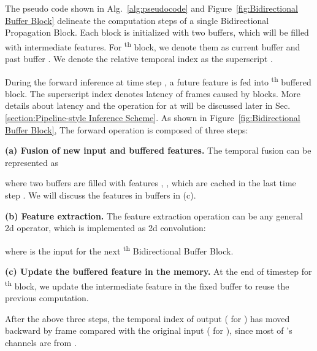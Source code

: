 \documentclass[sigconf]{acmart}
\newcommand{\ts}{\textsuperscript}
\begin{document}
The pseudo code shown in Alg.~\ref{alg:pseudocode} and Figure~\ref{fig:Bidirectional Buffer Block} delineate the computation steps of a single Bidirectional Propagation Block. 
Each block is initialized with two buffers, which will be filled with intermediate features. For \ts{th} block, we denote them as current buffer  and past buffer . We denote the relative temporal index as the superscript .


During the forward inference at time step , a future feature  is fed into \ts{th} buffered block. The superscript index  denotes latency of  frames caused by  blocks. More details about latency and the operation for  at will be discussed later in Sec.\ref{section:Pipeline-style Inference Scheme}.
As shown in Figure~\ref{fig:Bidirectional Buffer Block}, The forward operation is composed of three steps:


\textbf{(a) Fusion of new input and buffered features.}
The temporal fusion can be represented as 

where two buffers are filled with features , , which are cached in the last time step . We will discuss the features in buffers in (c).


\textbf{(b) Feature extraction.} The feature extraction operation can be any general 2d operator, which is implemented as 2d convolution:

where  is the input for the next \ts{th} Bidirectional Buffer Block.

\textbf{(c) Update the buffered feature in the memory.}
At the end of timestep  for \ts{th} block, we update the intermediate feature in the fixed buffer to reuse the previous computation. 


After the above three steps, the temporal index of output ( for ) has moved backward by  frame compared with the original input ( for ), since most of 's channels are from .
\end{document}
